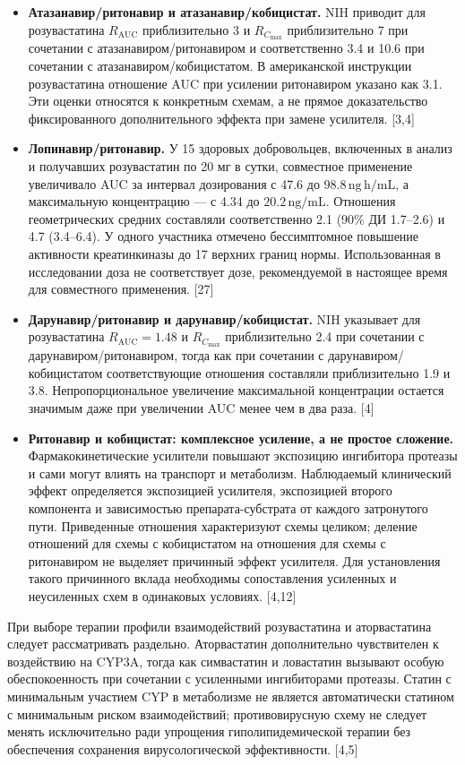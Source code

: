\documentclass[11pt]{article}
\begin{document}
\begin{itemize}
\item \textbf{Атазанавир\slash ритонавир и атазанавир\slash кобицистат.} NIH приводит для розувастатина \(R_{\mathrm{AUC}}\) приблизительно 3 и \(R_{C_{\max}}\) приблизительно 7 при сочетании с атазанавиром\slash ритонавиром и соответственно 3.4 и 10.6 при сочетании с атазанавиром\slash кобицистатом. В американской инструкции розувастатина отношение AUC при усилении ритонавиром указано как 3.1. Эти оценки относятся к конкретным схемам, а не прямое доказательство фиксированного дополнительного эффекта при замене усилителя. [3,4]
\item \textbf{Лопинавир/ритонавир.} У 15 здоровых добровольцев, включенных в анализ и получавших розувастатин по 20 мг в сутки, совместное применение увеличивало AUC за интервал дозирования с 47.6 до \(98.8\,\mathrm{ng\,h/mL}\), а максимальную концентрацию --- с 4.34 до \(20.2\,\mathrm{ng/mL}\). Отношения геометрических средних составляли соответственно 2.1 (90\% ДИ 1.7--2.6) и 4.7 (3.4--6.4). У одного участника отмечено бессимптомное повышение активности креатинкиназы до 17 верхних границ нормы. Использованная в исследовании доза не соответствует дозе, рекомендуемой в настоящее время для совместного применения. [27]
\item \textbf{Дарунавир/ритонавир и дарунавир/кобицистат.} NIH указывает для розувастатина \(R_{\mathrm{AUC}}=1.48\) и \(R_{C_{\max}}\) приблизительно 2.4 при сочетании с дарунавиром/ритонавиром, тогда как при сочетании с дарунавиром/кобицистатом соответствующие отношения составляли приблизительно 1.9 и 3.8. Непропорциональное увеличение максимальной концентрации остается значимым даже при увеличении AUC менее чем в два раза. [4]
\item \textbf{Ритонавир и кобицистат: комплексное усиление, а не простое сложение.} Фармакокинетические усилители повышают экспозицию ингибитора протеазы и сами могут влиять на транспорт и метаболизм. Наблюдаемый клинический эффект определяется экспозицией усилителя, экспозицией второго компонента и зависимостью препарата-субстрата от каждого затронутого пути. Приведенные отношения характеризуют схемы целиком; деление отношений для схемы с кобицистатом на отношения для схемы с ритонавиром не выделяет причинный эффект усилителя. Для установления такого причинного вклада необходимы сопоставления усиленных и неусиленных схем в одинаковых условиях. [4,12]
\end{itemize}

При выборе терапии профили взаимодействий розувастатина и аторвастатина следует рассматривать раздельно. Аторвастатин дополнительно чувствителен к воздействию на CYP3A, тогда как симвастатин и ловастатин вызывают особую обеспокоенность при сочетании с усиленными ингибиторами протеазы. Статин с минимальным участием CYP в метаболизме не является автоматически статином с минимальным риском взаимодействий; противовирусную схему не следует менять исключительно ради упрощения гиполипидемической терапии без обеспечения сохранения вирусологической эффективности. [4,5]
\end{document}
